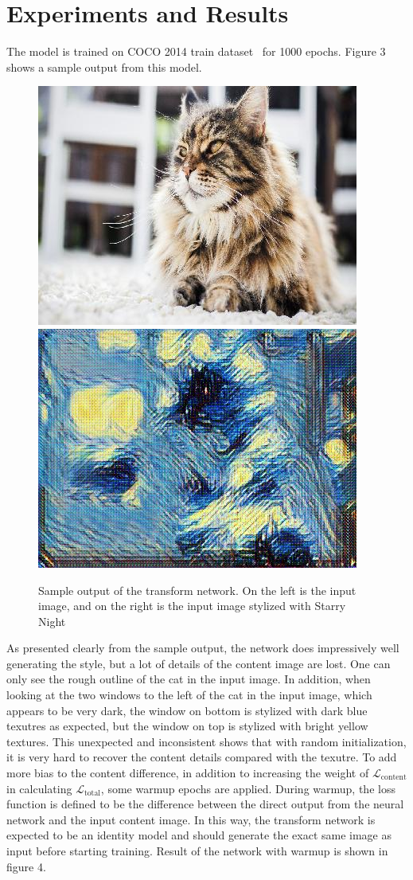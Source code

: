\documentclass[10pt,twocolumn,letterpaper]{article}
\begin{document}
\section{Experiments and Results}
The model is trained on COCO 2014 train dataset~\cite{coco} for 1000 epochs. Figure 3 shows a sample output from this model. 
\begin{figure}[t]
\begin{center}
   \includegraphics[width=0.45\linewidth]{input.jpg} \includegraphics[width=0.45\linewidth]{generated_net.jpg}	
\end{center}
   \caption{Sample output of the transform network. On the left is the input image, and on the right is the input image stylized with Starry Night}
\label{fig:long}
\label{fig:onecol}
\end{figure}
As presented clearly from the sample output, the network does impressively well generating the style, but a lot of details of the content image are lost. One can only see the rough outline of the cat in the input image. In addition, when looking at the two windows to the left of the cat in the input image, which appears to be very dark, the window on bottom is stylized with dark blue texutres as expected, but the window on top is stylized with bright yellow textures. This unexpected and inconsistent shows that with random initialization, it is very hard to recover the content details compared with the texutre. To add more bias to the content difference, in addition to increasing the weight of $\mathcal{L}_{\text{content}}$ in calculating $\mathcal{L}_{\text{total}}$, some warmup epochs are applied. During warmup, the loss function is defined to be the difference between the direct output from the neural network and the input content image. In this way, the transform network is expected to be an identity model and should generate the exact same image as input before starting training. Result of the network with warmup is shown in figure 4. \\
\end{document}
